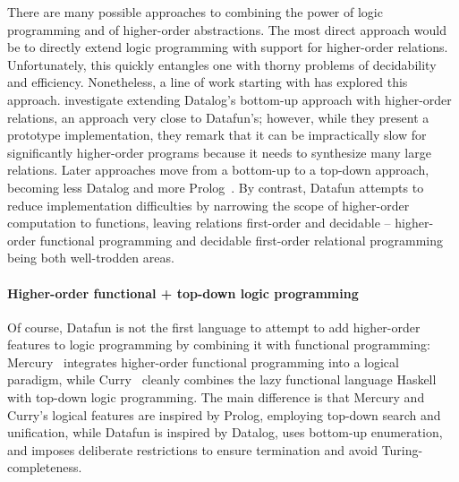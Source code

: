 There are many possible approaches to combining the power of logic programming and of higher-order abstractions.
%
The most direct approach would be to directly extend logic programming with support for higher-order relations.
%
Unfortunately, this quickly entangles one with thorny problems of decidability and efficiency.
%
Nonetheless, a line of work starting with \citet{DBLP:conf/slp/Wadge91} has explored this approach.
%
 investigate extending Datalog's bottom-up approach with higher-order relations, an approach very close to Datafun's; however, while they present a prototype implementation, they remark that it can be impractically slow for significantly higher-order programs because it needs to synthesize many large relations.
%
Later approaches move from a bottom-up to a top-down approach, becoming less Datalog and more Prolog~\citep{DBLP:journals/tocl/CharalambidisHRW13}.
%
By contrast, Datafun attempts to reduce implementation difficulties by narrowing the scope of higher-order computation to functions, leaving relations first-order and decidable -- higher-order functional programming and decidable first-order relational programming being both well-trodden areas.


\paragraph{Higher-order functional + top-down logic programming}

Of course, Datafun is not the first language to attempt to add higher-order features to logic programming by combining it with functional programming: Mercury~\citep{mercury} integrates higher-order functional programming into a logical paradigm, while Curry~\citep{curry} cleanly combines the lazy functional language Haskell with top-down logic programming. The main difference is that Mercury and Curry's logical features are inspired by Prolog, employing top-down search and unification, while Datafun is inspired by Datalog, uses bottom-up enumeration, and imposes deliberate restrictions to ensure termination and avoid Turing-completeness. 

